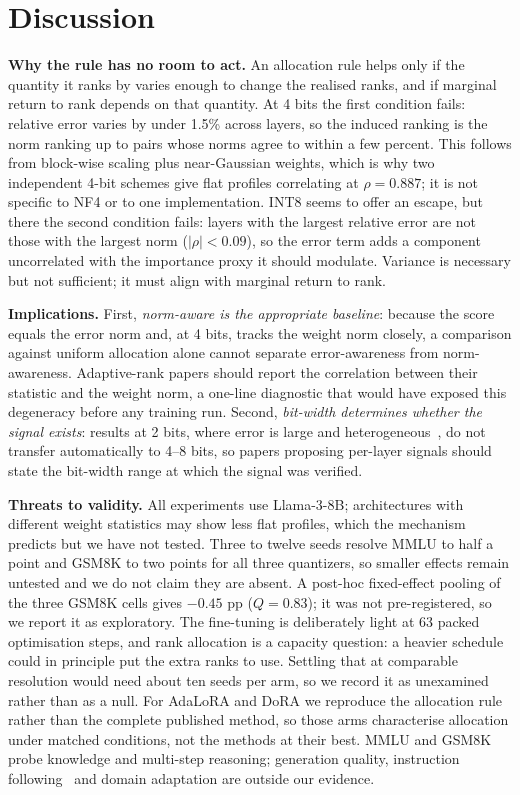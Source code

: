 \documentclass[preprint,12pt]{elsarticle}
\begin{document}
\section{Discussion}
\label{sec:discussion}

\textbf{Why the rule has no room to act.} An allocation rule helps only if the quantity it ranks by varies enough to change the realised ranks, and if marginal return to rank depends on that quantity. At 4 bits the first condition fails: relative error varies by under 1.5\% across layers, so the induced ranking is the norm ranking up to pairs whose norms agree to within a few percent. This follows from block-wise scaling plus near-Gaussian weights, which is why two independent 4-bit schemes give flat profiles correlating at $\rho = 0.887$; it is not specific to NF4 or to one implementation. INT8 seems to offer an escape, but there the second condition fails: layers with the largest relative error are not those with the largest norm ($|\rho| < 0.09$), so the error term adds a component uncorrelated with the importance proxy it should modulate. Variance is necessary but not sufficient; it must align with marginal return to rank.

\textbf{Implications.} First, \emph{norm-aware is the appropriate baseline}: because the score equals the error norm and, at 4 bits, tracks the weight norm closely, a comparison against uniform allocation alone cannot separate error-awareness from norm-awareness. Adaptive-rank papers should report the correlation between their statistic and the weight norm, a one-line diagnostic that would have exposed this degeneracy before any training run. Second, \emph{bit-width determines whether the signal exists}: results at 2 bits, where error is large and heterogeneous~\citep{kim2024ralora,lee2025rilq,chee2023quip}, do not transfer automatically to 4--8 bits, so papers proposing per-layer signals should state the bit-width range at which the signal was verified.

\textbf{Threats to validity.} All experiments use Llama-3-8B; architectures with different weight statistics may show less flat profiles, which the mechanism predicts but we have not tested. Three to twelve seeds resolve MMLU to half a point and GSM8K to two points for all three quantizers, so smaller effects remain untested and we do not claim they are absent. A post-hoc fixed-effect pooling of the three GSM8K cells gives $-0.45$ pp ($Q=0.83$); it was not pre-registered, so we report it as exploratory. The fine-tuning is deliberately light at 63 packed optimisation steps, and rank allocation is a capacity question: a heavier schedule could in principle put the extra ranks to use. Settling that at comparable resolution would need about ten seeds per arm, so we record it as unexamined rather than as a null. For AdaLoRA and DoRA we reproduce the allocation rule rather than the complete published method, so those arms characterise allocation under matched conditions, not the methods at their best. MMLU and GSM8K probe knowledge and multi-step reasoning; generation quality, instruction following~\citep{zhou2023ifeval} and domain adaptation are outside our evidence. 
\end{document}
